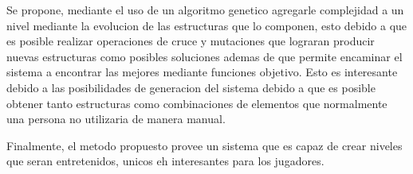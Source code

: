 Se propone, mediante el uso de un algoritmo genetico agregarle complejidad a un
nivel mediante la evolucion de las estructuras que lo componen, esto debido a
que es posible realizar operaciones de cruce y mutaciones que lograran producir
nuevas estructuras como posibles soluciones ademas de que permite encaminar el
sistema a encontrar las mejores mediante funciones objetivo. Esto es interesante
debido a las posibilidades de generacion del sistema debido a que es posible
obtener tanto estructuras como combinaciones de elementos que normalmente una
persona no utilizaria de manera manual.

Finalmente, el metodo propuesto provee un sistema que es capaz de crear niveles
que seran entretenidos, unicos eh interesantes para los jugadores.
 